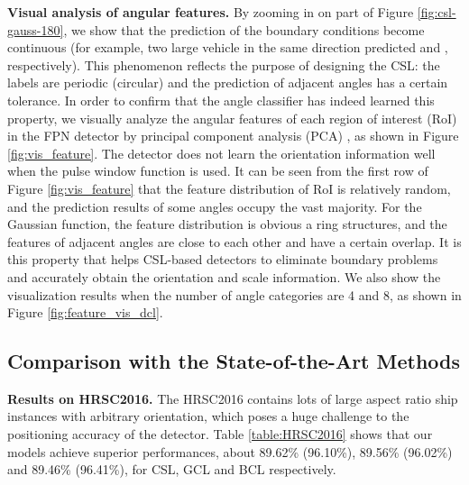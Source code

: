 \documentclass[10pt,journal,compsoc]{IEEEtran}
\begin{document}
\noindent \textbf{Visual analysis of angular features.}
By zooming in on part of Figure \ref{fig:csl-gauss-180}, we show that the prediction of the boundary conditions become continuous (for example, two large vehicle in the same direction predicted  and , respectively). This phenomenon reflects the purpose of designing the CSL: the labels are periodic (circular) and the prediction of adjacent angles has a certain tolerance. In order to confirm that the angle classifier has indeed learned this property, we visually analyze the angular features of each region of interest (RoI) in the FPN detector by principal component analysis (PCA) \cite{wold1987principal}, as shown in Figure \ref{fig:vis_feature}. The detector does not learn the orientation information well when the pulse window function is used. It can be seen from the first row of Figure \ref{fig:vis_feature} that the feature distribution of RoI is relatively random, and the prediction results of some angles occupy the vast majority. For the Gaussian function, the feature distribution is obvious a ring structures, and the features of adjacent angles are close to each other and have a certain overlap. It is this property that helps CSL-based detectors to eliminate boundary problems and accurately obtain the orientation and scale information. We also show the visualization results when the number of angle categories are 4 and 8, as shown in Figure \ref{fig:feature_vis_dcl}. 

\subsection{Comparison with the State-of-the-Art Methods}\label{sec:sota}
\noindent \textbf{Results on HRSC2016.}
The HRSC2016 contains lots of large aspect ratio ship instances with arbitrary orientation, which poses a huge challenge to the positioning accuracy of the detector. Table \ref{table:HRSC2016} shows that our models achieve superior performances, about 89.62\% (96.10\%), 89.56\% (96.02\%) and 89.46\% (96.41\%), for CSL, GCL and BCL respectively.\\
\end{document}
